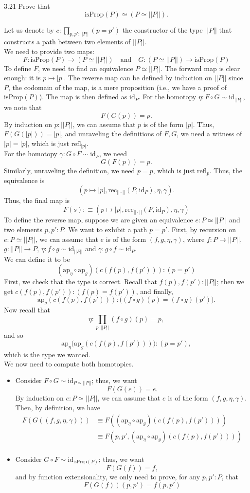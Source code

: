 \documentclass[14pt]{extarticle}
\newcommand{\0}{{\mathbf 0}}
\newcommand{\1}{{\mathbf 1}}
\newcommand{\2}{{\mathbf 2}}
\newcommand{\mt}{\mapsto}
\newcommand{\rec}{\mathrm{rec}}
\newcommand{\refl}{\mathrm{refl}}
\newcommand{\id}{\mathrm{id}}
\newcommand{\ap}{\mathrm{ap}}
\newcommand{\isProp}{\mathrm{isProp}}
\newcommand{\quadt}[1]{\quad \text{#1} \quad}
\begin{document}
\begin{prob}{3.21}{}
Prove that \[\isProp(P) \simeq (P \simeq ||P||).\]
\end{prob}
Let us denote by $c : \prod_{p,p' : ||P||} (p = p')$ the constructor of the type $||P||$ that constructs a path between two elements of $||P||$.\\
We need to provide two maps:
\[F : \isProp(P) \to (P \simeq ||P||) \quadt{and} G : (P \simeq ||P||) \to \isProp(P)\]
To define $F$, we need to find an equivalence $P \simeq ||P||$. The forward map is clear enough: it is $p \mt |p|$. The reverse map can be defined by induction on $||P||$ since $P$, the codomain of the map, is a mere proposition (i.e., we have a proof of $\isProp(P)$). The map is then defined as $\id_{P}$. For the homotopy $\eta : F \circ G \sim \id_{||P||}$, we note that
\[F(G(p)) = p.\] By induction on $p:||P||$, we can assume that $p$ is of the form $|p|$. Thus, $F(G(|p|)) = |p|$, and unraveling the definitions of $F,G$, we need a witness of $|p| = |p|$, which is just $\refl_{|p|}$.\\
For the homotopy $\gamma : G \circ F \sim \id_{P}$, we need \[G(F(p)) = p.\] Similarly, unraveling the definition, we need $p = p$, which is just $\refl_p$.
Thus, the equivalence is
\[(p \mt |p|, \rec_{||\cdot||}(P,\id_{P}), \eta, \gamma).\] Thus, the final map is
\[F(s) :\equiv (p \mt |p|, \rec_{||\cdot||}(P,\id_{P}), \eta, \gamma)\]
To define the reverse map, suppose we are given an equivalence $e : P \simeq ||P||$ and two elements $p,p':P$. We want to exhibit a path $p = p'$. First, by recursion on $e:P \simeq ||P||$, we can assume that $e$ is of the form $(f,g,\eta,\gamma)$, where $f : P \to ||P||$, $g : ||P|| \to P$,
$\eta : f \circ g \sim \id_{||P||}$ and $\gamma : g \circ f \sim \id_{P}$.\\
We can define it to be \[(\ap_{\eta} \circ \ap_{g})(c(f(p), f(p'))) : (p = p')\]
First, we check that the type is correct. Recall that $f(p),f(p') : ||P||$; then we get $c(f(p), f(p')) : (f(p) = f(p'))$, and finally, \[\ap_{g}(c(f(p), f(p'))) : \Big((f\circ g)(p) = (f\circ g)(p')\Big).\] Now recall that
\[\eta : \prod_{p:||P||} (f \circ g)(p) = p,\] and so \[\ap_\eta\Big(\ap_{g}(c(f(p), f(p')))\Big) : (p = p'),\] which is the type we wanted.\\
We now need to compute both homotopies.

\begin{itemize}
\item Consider $F \circ G \sim \id_{P \simeq ||P||}$; thus, we want
\[F(G(e)) = e.\] By induction on $e : P \simeq ||P||$, we can assume that $e$ is of the form $(f,g,\eta,\gamma)$. Then, by definition, we have
\begin{align*}
F(G((f,g,\eta,\gamma))) &\equiv F((\ap_{\eta} \circ \ap_{g})(c(f(p), f(p')))) \\
&\equiv F(p,p',(\ap_{\eta} \circ \ap_{g})(c(f(p), f(p')))) \\
\end{align*} 
\item Consider $G \circ F \sim \id_{\isProp(P)}$; thus, we want
\[F(G(f)) = f,\] and by function extensionality, we only need to prove, for any $p,p' : P$, that
\[F(G(f))(p,p') = f(p,p')\]
\end{itemize}
\end{document}
